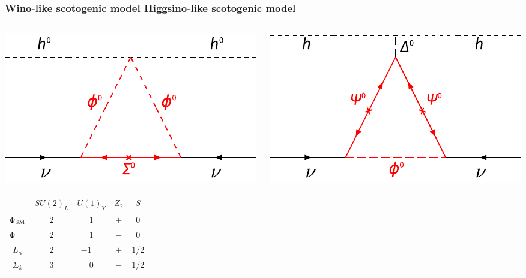 \documentclass[%
xcolor=dvipsnames,table%
]{beamer}
\begin{document}
\begin{frame}
  \frametitle{Wino-like {\tiny scotogenic model} \hspace{3.5cm} Higgsino-like  {\tiny scotogenic model}}

\vspace{0.2cm}

\begin{columns}
  \begin{column}{0.5\textwidth}
    \includegraphics[scale=0.7]{rs_iii}

\begin{tabular}{|c||c|c|c|c|c|}
\hline 
&  $SU(2)_{L}$ & $  U(1)_{Y}$   & $Z_2$ & $S$
\\ \hline \hline 
 $\Phi_{\rm SM}$  & $2$&$ 1$ & $+$ & $0$ \\
\hline
 $\Phi\phantom{_{\rm SM}}$ & $2$&$ 1$  & $-$ & $0$ \\
\hline
 ${L_\alpha}$  & $2$&$-1\phantom{-} $ & $+$ & $1/2$ \\
\hline 
 ${\Sigma}_{k}$ & $3$&$ 0$  & $-$ & $1/2$ \\ 
\hline
\end{tabular} 
  \end{column}
  \begin{column}{0.5\textwidth}
        \includegraphics[scale=0.7]{rs_ii}



\end{column}
\end{columns}
\end{frame}
\end{document}
